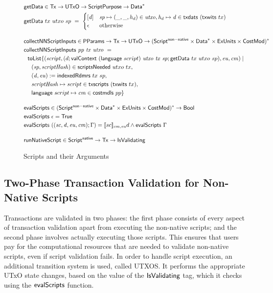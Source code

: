 \begin{figure}[htb]
  \begin{align*}
    & \fun{getData} \in \Tx \to \UTxO \to \ScriptPurpose \to \seqof{\Data} \\
    & \fun{getData}~{tx}~{utxo}~{sp}~=~
      \begin{cases}
        [\var{d}] & \var{sp} \mapsto (\_, \_, h_d) \in \var{utxo}, \var{h_d}\mapsto \var{d} \in \fun{txdats}~(\fun{txwits}~tx) \\
        \epsilon  & \text{otherwise}
      \end{cases}
    \nextdef
    & \fun{collectNNScriptInputs} \in \PParams \to \Tx \to \UTxO \to \seqof{(\ScriptNonNative \times \seqof{\Data} \times \ExUnits \times \CostMod)} \\
    & \fun{collectNNScriptInputs} ~\var{pp}~\var{tx}~ \var{utxo} ~=~ \\
    & ~~\fun{toList} \{ (\var{script}, (d; \fun{valContext}~(\fun{language}~{script})~\var{utxo}~\var{tx}~\var{sp}; \fun{getData}~tx~utxo~sp), \var{eu}, \var{cm}) \mid \\
    & ~~~~(\var{sp}, \var{scriptHash}) \in \fun{scriptsNeeded}~{utxo}~{tx}, \\
    & ~~~~(\var{d}, \var{eu}) := \fun{indexedRdmrs}~tx~sp, \\
    & ~~~~\var{scriptHash}\mapsto \var{script}\in \fun{txscripts}~(\fun{txwits}~tx), \\
    & ~~~~\fun{language}~{script} \mapsto \var{cm} \in \fun{costmdls}~{pp} \}
    \nextdef
    & \fun{evalScripts} \in \seqof{(\ScriptNonNative \times \seqof{\Data} \times \ExUnits \times \CostMod)} \to \Bool \\
    & \fun{evalScripts}~\epsilon = \True \\
    & \fun{evalScripts}~((\var{sc}, \var{d}, \var{eu}, \var{cm});\Gamma) =
      \llbracket sc \rrbracket_{cm,\var{eu}} d \land \fun{evalScripts}~\Gamma
    \nextdef
    &\fun{runNativeScript} \in\ScriptNative \to \Tx \to \IsValidating
  \end{align*}
  \caption{Scripts and their Arguments}
  \label{fig:functions:script2}
\end{figure}

\subsection{Two-Phase Transaction Validation for Non-Native Scripts}
\label{sec:two-phase}

Transactions are validated in two phases:
the first phase consists of every aspect of transaction validation apart from executing the non-native scripts; and
the second phase involves actually executing those scripts.
This ensures that users pay for the computational resources that are needed to validate non-native scripts, even
if script validation fails. %
In order to handle script execution, an additional transition system is used, called UTXOS.
It performs the appropriate UTxO state changes, based on the
value of the $\mathsf{IsValidating}$ tag, which it checks using the $\mathsf{evalScripts}$ function.

